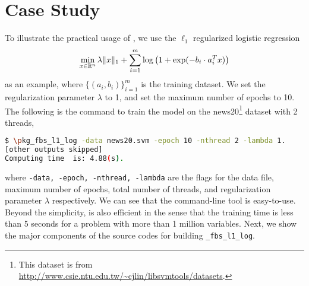 \section{Case Study}\label{sec:quick_start}
 To illustrate the practical usage of \pkg, we use the $\ell_1$ regularized logistic regression
\begin{equation}\label{eq:l1_log}
\min_{x \in \mathbb{R}^n} \lambda \|x\|_1 + \sum_{i = 1}^m \log\left(1 + \exp(-b_i \cdot a_i^T x)\right)
\end{equation}
as an example, where $\{(a_i, b_i)\}_{i = 1}^m$ is the training dataset. We set the regularization parameter $\lambda$ to 1, and set the maximum number of epochs to 10. The following is the command to train the model on the news20\footnote{ This dataset is from \url{http://www.csie.ntu.edu.tw/~cjlin/libsvmtools/datasets}.} dataset with 2 threads,
\begin{lstlisting}[language=bash]
$ \pkg_fbs_l1_log -data news20.svm -epoch 10 -nthread 2 -lambda 1.
[other outputs skipped]
Computing time  is: 4.88(s).
\end{lstlisting}
where \texttt{-data, -epoch, -nthread, -lambda} are the flags for the data file, maximum number of epochs, total number of threads, and regularization parameter $\lambda$ respectively. We can see that the command-line tool is easy-to-use. Beyond the simplicity, \pkg is also efficient in the sense that the training time is less than 5 seconds for a problem with more than 1 million variables. Next, we show the major components of the source codes for building \texttt{\pkg\_fbs\_l1\_log}.

